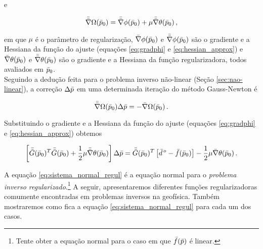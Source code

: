 \noindent e

\begin{equation}
\bar{\bar{\nabla}}\Omega(\bar{p}_0) = \bar{\bar{\nabla}}\phi(\bar{p}_0) +
    \mu\bar{\bar{\nabla}}\theta(\bar{p}_0) \thinspace ,
\label{eq:hessian_objetivo}
\end{equation}

\noindent em que $\mu$ é o parâmetro de regularização,
$\bar{\nabla}\phi(\bar{p}_0)$ e $\bar{\bar{\nabla}}\phi(\bar{p}_0)$
são o gradiente e a Hessiana da função do ajuste (equações \ref{eq:gradphi} e
\ref{eq:hessian_approx}) e
$\bar{\nabla}\theta(\bar{p}_0)$ e $\bar{\bar{\nabla}}\theta(\bar{p}_0)$ são o
gradiente e a Hessiana da função regularizadora, todos avaliados em $\bar{p}_0$.
\\
\indent Seguindo a dedução feita para o problema inverso não-linear (Seção
\ref{sec:nao-linear}), a correção $\Delta\bar{p}$ em uma determinada iteração
do método Gauss-Newton é

\begin{equation}
\bar{\bar{\nabla}}\Omega(\bar{p}_0)\Delta\bar{p} = -\bar{\nabla}\Omega(\bar{p}_0)
    \thinspace .
\label{eq:sistema_normal_objetivo}
\end{equation}

\noindent Substituindo o gradiente e a Hessiana da função do ajuste (equações
\ref{eq:gradphi} e \ref{eq:hessian_approx}) obtemos

\begin{equation}
\left[\bar{\bar{G}}(\bar{p}_0)^T\bar{\bar{G}}(\bar{p}_0) +
      \frac{1}{2}\mu\bar{\bar{\nabla}}\theta(\bar{p}_0)\right]\Delta\bar{p} =
\bar{\bar{G}}(\bar{p}_0)^T \left[\bar{d}^{\thinspace o} - \bar{f}(\bar{p}_0)\right] -
\frac{1}{2}\mu\bar{\nabla}\theta(\bar{p}_0)
    \thinspace .
\label{eq:sistema_normal_regul}
\end{equation}

\indent A equação \ref{eq:sistema_normal_regul} é a equação normal para o
{\it problema inverso regularizado}.\footnote{Tente obter a equação normal para
o caso em que $\bar{f}(\bar{p})$ é linear.}
A seguir, apresentaremos diferentes funções regularizadoras comumente encontradas
em problemas inversos na geofísica.
Também mostraremos como fica a equação \ref{eq:sistema_normal_regul} para cada
um dos casos.






